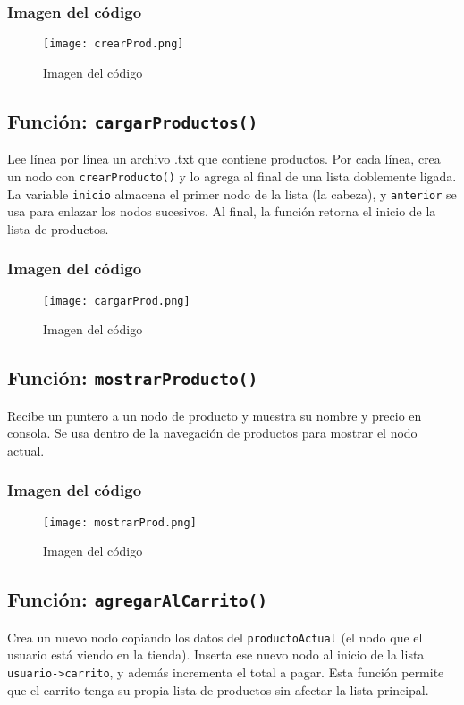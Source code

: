 \documentclass{article}
\begin{document}
\subsubsection{Imagen del código}

\begin{figure}[!ht]
\centering
\texttt{[image: crearProd.png]}
\caption{Imagen del código}
\end{figure}

\pagebreak
   \subsection{Función: \texttt{cargarProductos()}}
   Lee línea por línea un archivo .txt que contiene productos. Por cada línea, crea un nodo con \texttt{crearProducto()} y lo agrega al final de una lista doblemente ligada. La variable \texttt{inicio} almacena el primer nodo de la lista (la cabeza), y \texttt{anterior} se usa para enlazar los nodos sucesivos. Al final, la función retorna el inicio de la lista de productos.

   \subsubsection{Imagen del código}

\begin{figure}[!ht]
\centering
\texttt{[image: cargarProd.png]}
\caption{Imagen del código}
\end{figure}
   
   \subsection{Función: \texttt{mostrarProducto()}}
   Recibe un puntero a un nodo de producto y muestra su nombre y precio en consola. Se usa dentro de la navegación de productos para mostrar el nodo actual.

\pagebreak
   \subsubsection{Imagen del código}
   
\begin{figure}[!ht]
\centering
\texttt{[image: mostrarProd.png]}
\caption{Imagen del código}
\end{figure}
   
   \subsection{Función: \texttt{agregarAlCarrito()}}
   Crea un nuevo nodo copiando los datos del \texttt{productoActual} (el nodo que el usuario está viendo en la tienda). Inserta ese nuevo nodo al inicio de la lista \texttt{usuario->carrito}, y además incrementa el total a pagar. Esta función permite que el carrito tenga su propia lista de productos sin afectar la lista principal.
\end{document}
